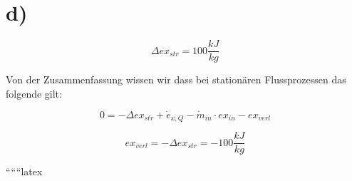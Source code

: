 

\section*{d)}

\[
\Delta ex_{str} = 100 \frac{kJ}{kg}
\]

Von der Zusammenfassung wissen wir dass bei stationären Flussprozessen das folgende gilt:

\[
0 = -\Delta ex_{str} + \dot{e}_{x,Q} - \dot{m}_{in} \cdot ex_{in} - ex_{verl}
\]

\[
ex_{verl} = -\Delta ex_{str} = -100 \frac{kJ}{kg}
\]

``````latex